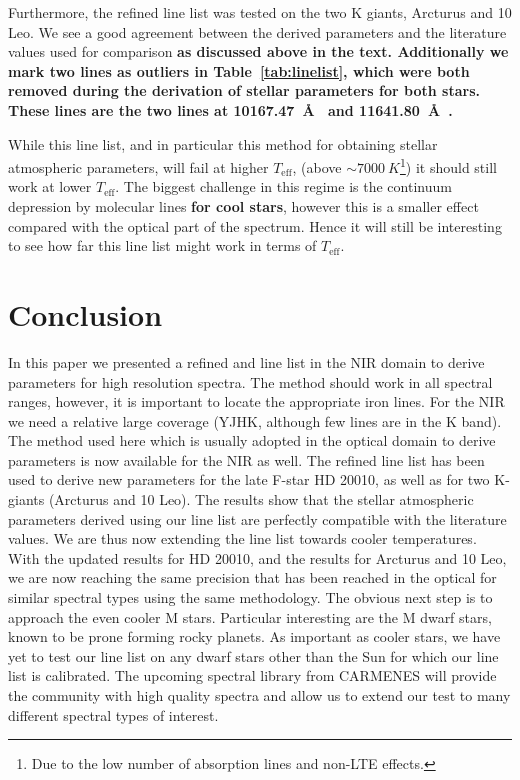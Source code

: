 \documentclass{aa}
\begin{document}
Furthermore, the refined line list was tested on the two K giants, Arcturus and 10 Leo. We see a
good agreement between the derived parameters and the literature values used for comparison {\bf as
discussed above in the text. Additionally we mark two lines as outliers in Table~\ref{tab:linelist},
which were both removed during the derivation of stellar parameters for both stars. These lines are
the two  lines at \SI{10167.47}{\AA{}} and \SI{11641.80}{\AA{}}.}

While this line list, and in particular this method for obtaining stellar atmospheric parameters,
will fail at higher $T_\mathrm{eff}$, (above $\sim\SI{7000}{K}$\footnote{Due to the low number of
absorption lines and non-LTE effects.}) it should still work at lower $T_\mathrm{eff}$. The biggest
challenge in this regime is the continuum depression by molecular lines {\bf for cool stars},
however this is a smaller effect compared with the optical part of the spectrum. Hence it will still
be interesting to see how far this line list might work in terms of $T_\mathrm{eff}$.



\section{Conclusion}
\label{sec:conclusion}

In this paper we presented a refined  and  line list in
the NIR domain to derive parameters for high resolution spectra. The
method should work in all spectral ranges, however, it is important to locate
the appropriate iron lines. For the NIR we need a relative large coverage (YJHK,
although few lines are in the K band). The method used here which is usually
adopted in the optical domain to derive parameters is now available for the NIR
as well. The refined line list has been used to derive new parameters for the
late F-star HD 20010, as well as for two K-giants (Arcturus and 10 Leo). The
results show that the stellar atmospheric parameters derived using our line list
are perfectly compatible with the literature values. We are thus now extending
the line list towards cooler temperatures. With the updated results for HD
20010, and the results for Arcturus and 10 Leo, we are now reaching the same
precision that has been reached in the optical for similar spectral types using
the same methodology. The obvious next step is to approach the even cooler M
stars. Particular interesting are the M dwarf stars, known to be prone forming
rocky planets. As important as cooler stars, we have yet to test our line list
on any dwarf stars other than the Sun for which our line list is calibrated. The
upcoming spectral library from CARMENES \citep{Reiners2017} will provide
the community with high quality spectra and allow us to extend our test to many
different spectral types of interest.
\end{document}
